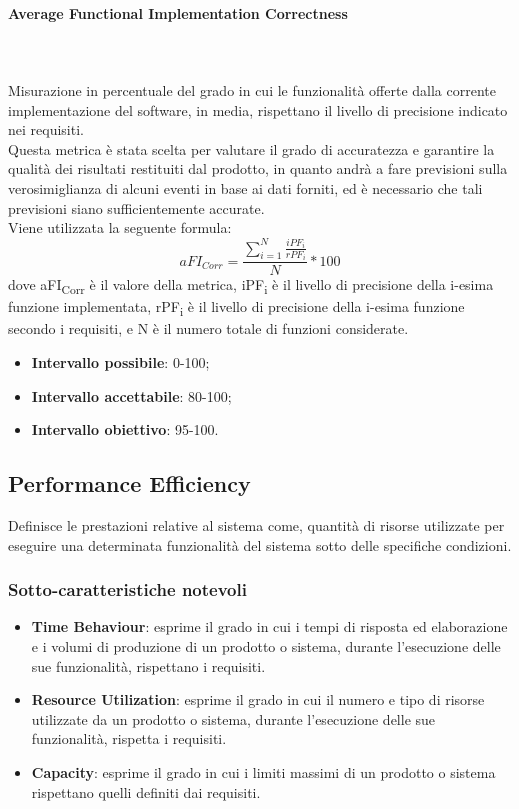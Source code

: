 \paragraph{Average Functional Implementation Correctness} ~\\ ~\\
Misurazione in percentuale del grado in cui le funzionalità offerte dalla corrente implementazione del software, in media, rispettano il livello di precisione indicato nei requisiti.\\
Questa metrica è stata scelta per valutare il grado di accuratezza e garantire la qualità dei risultati restituiti dal prodotto, in quanto andrà a fare previsioni sulla verosimiglianza di alcuni eventi in base ai dati forniti, ed è necessario che tali previsioni siano sufficientemente accurate.\\
Viene utilizzata la seguente formula:
$$aFI_{Corr}=\frac{\sum\limits_{i=1}^N\frac{iPF_i}{rPF_i}}{N}*100$$
dove aFI\textsubscript{Corr} è il valore della metrica, iPF\textsubscript{i} è il livello di precisione della i-esima funzione implementata, rPF\textsubscript{i} è il livello di precisione della i-esima funzione secondo i requisiti, e N è il numero totale di funzioni considerate.
\begin{itemize}
	\item{\textbf{Intervallo possibile}: 0-100;}
	\item{\textbf{Intervallo accettabile}: 80-100;}
	\item{\textbf{Intervallo obiettivo}: 95-100.}
\end{itemize}

\subsection{Performance Efficiency}
Definisce le prestazioni relative al sistema come, quantità di risorse utilizzate per eseguire una determinata funzionalità del sistema sotto delle specifiche condizioni. 
\subsubsection{Sotto-caratteristiche notevoli}
\begin{itemize}
	\item{\textbf{Time Behaviour}}: esprime il grado in cui i tempi di risposta ed elaborazione e i volumi di produzione di un prodotto o sistema, durante l'esecuzione delle sue funzionalità, rispettano i requisiti.
	\item{\textbf{Resource Utilization}}: esprime il grado in cui il numero e tipo di risorse utilizzate da un prodotto o sistema, durante l'esecuzione delle sue funzionalità, rispetta i requisiti.
	\item{\textbf{Capacity}}: esprime il grado in cui i limiti massimi di un prodotto o sistema rispettano quelli definiti dai requisiti.
\end{itemize}
